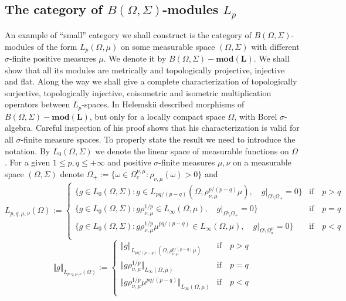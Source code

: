 
\subsection{The category of \texorpdfstring{$B(\Omega,\Sigma)$}{B(Omega,Sigma)}-modules \texorpdfstring{$L_p$}{Lp}}
\label{SubSectionTheCategoryOfBOmegaSigmaModulesLp}

An example of ``small'' category we shall construct is the category of $B(\Omega,\Sigma)$-modules of the form $L_p(\Omega,\mu)$ on some measurable space $(\Omega,\Sigma)$ with different $\sigma$-finite positive measures $\mu$. We denote it by $B(\Omega,\Sigma)-\mathbf{mod(L)}$. We shall show that all its modules are metrically and topologically projective, injective and flat. Along the way we shall give a complete characterization of topologically surjective, topologically injective, coisometric and isometric multiplication operators between $L_p$-spaces. In \cite{HelTensProdAndMultModLp} Helemskii described morphisms of $B(\Omega,\Sigma)-\mathbf{mod(L)}$, but only for a locally compact space $\Omega$, with Borel $\sigma$-algebra. Careful inspection of his proof shows that his characterization is valid for all $\sigma$-finite measure spaces. To properly state the result we need to introduce the notation. By $L_0(\Omega,\Sigma)$ we denote the linear space of measurable functions on $\Omega$. For a given $1\leq p,q\leq +\infty$ and positive $\sigma$-finite measures $\mu,\nu$ on a measurable space $(\Omega,\Sigma)$ denote $\Omega_+:=\{\omega\in\Omega_c^{\nu,\mu}:\rho_{\nu,\mu}(\omega)>0\}$ and
$$
L_{p,q,\mu,\nu}(\Omega):=
\begin{cases}
\{g\in L_0(\Omega,\Sigma):g\in L_{pq/(p-q)}(\Omega,\rho_{\nu,\mu}^{p/(p-q)}\mu),\quad g|_{\Omega\setminus\Omega_+}=0\}&\text{if}\quad p>q\\
\{g\in L_0(\Omega,\Sigma):g\rho_{\nu,\mu}^{1/p}\in L_{\infty}(\Omega,\mu),\quad g|_{\Omega\setminus\Omega_+}=0\}&\text{if}\quad p=q\\
\{g\in L_0(\Omega,\Sigma):g\rho_{\nu,\mu}^{1/p}\mu^{pq/(p-q)}\in L_{\infty}(\Omega,\mu),\quad g|_{\Omega\setminus\Omega_a^{\mu}}=0\}&\text{if}\quad p<q\\
\end{cases}
$$
$$
\Vert g\Vert_{L_{p,q,\mu,\nu}(\Omega)}:=
\begin{cases}
\Vert g\Vert_{L_{pq/(p-q)}(\Omega,\rho_{\nu,\mu}^{p/(p-q)}\mu)}&\text{if}\quad p>q\\
\Vert g\rho_{\nu,\mu}^{1/p}\Vert_{L_{\infty}(\Omega,\mu)}&\text{if}\quad p=q\\
\Vert g\rho_{\nu,\mu}^{1/p}\mu^{pq/(p-q)}\Vert_{L_{\infty}(\Omega,\mu)}&\text{if}\quad p<q\\
\end{cases}
$$


